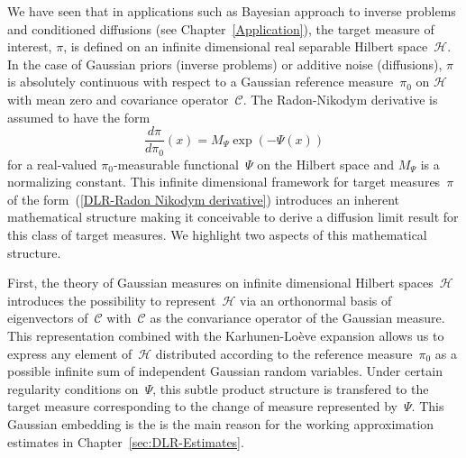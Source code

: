 We have seen that in applications such as Bayesian approach to inverse problems and conditioned diffusions (see Chapter~\ref{Application}), the target measure of interest, $\pi$, is defined on an infinite dimensional real separable Hilbert space~$\mathcal{H}$. In the case of Gaussian priors (inverse problems) or additive noise (diffusions), $\pi$ is absolutely continuous with respect to a Gaussian reference measure~$\pi_0$ on $\mathcal{H}$ with mean zero and covariance operator~$\mathcal{C}$. The Radon-Nikodym derivative is assumed to have the form
\begin{equation}
\label{DLR-Radon Nikodym derivative}
 \frac{d \pi}{d \pi_0}(x) = M_{\Psi} \exp (- \Psi(x))
\end{equation}
for a real-valued $\pi_0$-measurable functional~$\Psi$ on the Hilbert space and $M_{\Psi}$ is a normalizing constant. This infinite dimensional framework for target measures~$\pi$ of the form~(\ref{DLR-Radon Nikodym derivative}) introduces an inherent mathematical structure  making it conceivable to derive a diffusion limit result for this class of target measures. We highlight two aspects of this mathematical structure. 

First, the theory of Gaussian measures on infinite dimensional Hilbert spaces~$\mathcal{H}$ introduces the possibility to represent~$\mathcal{H}$ via an orthonormal basis of eigenvectors of~$\mathcal{C}$ with~$\mathcal{C}$ as the convariance operator of the Gaussian measure. This representation combined with the Karhunen-Lo\`{e}ve expansion allows us to express any element of~$\mathcal{H}$ distributed according to the reference measure~$\pi_0$ as a possible infinite sum of independent Gaussian random variables. Under certain regularity conditions on~$\Psi$, this subtle product structure is transfered to the target measure corresponding to the change of measure represented by~$\Psi$. This Gaussian embedding is the is the main reason for the working approximation estimates in Chapter~\ref{sec:DLR-Estimates}.

